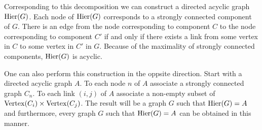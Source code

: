Corresponding to this decomposition we can construct a directed acyclic graph $\mathrm{Hier} (G)$.  Each node of $\mathrm{Hier} (G)$ corresponds to a strongly connected component of $G$. There is an edge from the node corresponding to component $C$ to the node corresponding to component $C'$ if and only if there exists a link from some vertex in $C$ to some vertex in $C'$ in $G$.  Because of the maximality of strongly connected components, $\mathrm{Hier} (G)$ is acyclic.

One can also perform this construction in the oppsite direction.  Start with a directed acyclic graph $A$.  To each node $n$ of $A$ associate
a strongly connected graph $C_n$.  To each link $(i,j)$ of $A$ associate a non-empty subset of $\mathrm{Vertex}(C_i) \times \mathrm{Vertex}(C_j)$.  The result will be a graph $G$ such that $\mathrm{Hier}(G) = A$ and furthermore, every graph $G$ such that $\mathrm{Hier}(G) = A$ can be obtained in this manner.



